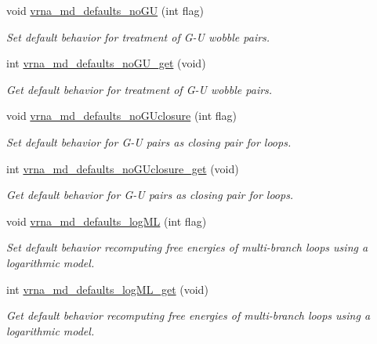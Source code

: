\begin{DoxyCompactItemize}
void \mbox{\hyperlink{group__model__details_ga98218f85c7a957a1d1ddf4627fdf5a39}{vrna\+\_\+md\+\_\+defaults\+\_\+no\+GU}} (int flag)
\begin{DoxyCompactList}\small\item\em Set default behavior for treatment of G-\/U wobble pairs. \end{DoxyCompactList}\item 
int \mbox{\hyperlink{group__model__details_ga5faa7d4e536d7fe36ec25428c0cf2563}{vrna\+\_\+md\+\_\+defaults\+\_\+no\+G\+U\+\_\+get}} (void)
\begin{DoxyCompactList}\small\item\em Get default behavior for treatment of G-\/U wobble pairs. \end{DoxyCompactList}\item 
void \mbox{\hyperlink{group__model__details_gade5b9951d71ca2fb357a4e6c0c18ccd1}{vrna\+\_\+md\+\_\+defaults\+\_\+no\+G\+Uclosure}} (int flag)
\begin{DoxyCompactList}\small\item\em Set default behavior for G-\/U pairs as closing pair for loops. \end{DoxyCompactList}\item 
int \mbox{\hyperlink{group__model__details_ga4f7fdad083243a5348d63320ddaa70f3}{vrna\+\_\+md\+\_\+defaults\+\_\+no\+G\+Uclosure\+\_\+get}} (void)
\begin{DoxyCompactList}\small\item\em Get default behavior for G-\/U pairs as closing pair for loops. \end{DoxyCompactList}\item 
void \mbox{\hyperlink{group__model__details_ga3de50a73455d88c3957386933b8e1f90}{vrna\+\_\+md\+\_\+defaults\+\_\+log\+ML}} (int flag)
\begin{DoxyCompactList}\small\item\em Set default behavior recomputing free energies of multi-\/branch loops using a logarithmic model. \end{DoxyCompactList}\item 
int \mbox{\hyperlink{group__model__details_ga93f04e070d529c5d0bb87c9681f6ad29}{vrna\+\_\+md\+\_\+defaults\+\_\+log\+M\+L\+\_\+get}} (void)
\begin{DoxyCompactList}\small\item\em Get default behavior recomputing free energies of multi-\/branch loops using a logarithmic model. \end{DoxyCompactList}\item 

\end{DoxyCompactItemize}
